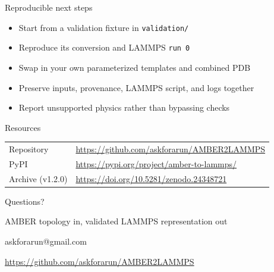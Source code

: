 \documentclass[aspectratio=169,11pt]{beamer}
\begin{document}
\begin{frame}{Reproducible next steps}
\begin{itemize}
  \item Start from a validation fixture in \texttt{validation/}
  \item Reproduce its conversion and LAMMPS \texttt{run 0}
  \item Swap in your own parameterized templates and combined PDB
  \item Preserve inputs, provenance, LAMMPS script, and logs together
  \item Report unsupported physics rather than bypassing checks
\end{itemize}
\vspace{0.4cm}
\begin{block}{Resources}
\begin{tabular}{@{}ll@{}}
Repository & \url{https://github.com/askforarun/AMBER2LAMMPS} \\
PyPI & \url{https://pypi.org/project/amber-to-lammps/} \\
Archive (v1.2.0) & \url{https://doi.org/10.5281/zenodo.24348721} \\
\end{tabular}
\end{block}
\end{frame}

\begin{frame}[plain]
  \centering
  \vspace{1.5cm}
  {\color{white}\Huge Questions?}\par
  \vspace{0.7cm}
  {\color{SoftAmber}\large AMBER topology in, validated LAMMPS representation out}\par
  \vspace{1.2cm}
  {\color{white}\normalsize askforarun@gmail.com}\par
  \vspace{0.25cm}
  {\color{white}\small\url{https://github.com/askforarun/AMBER2LAMMPS}}
\end{frame}
\end{document}
